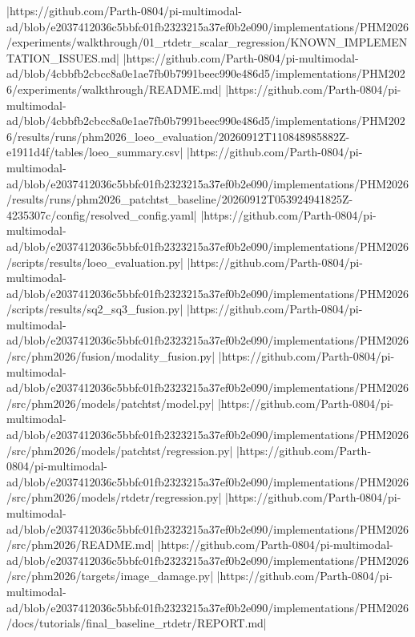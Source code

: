 |https://github.com/Parth-0804/pi-multimodal-ad/blob/e2037412036c5bbfc01fb2323215a37ef0b2e090/implementations/PHM2026/experiments/walkthrough/01_rtdetr_scalar_regression/KNOWN_IMPLEMENTATION_ISSUES.md|
|https://github.com/Parth-0804/pi-multimodal-ad/blob/4cbbfb2cbcc8a0e1ae7fb0b7991beec990e486d5/implementations/PHM2026/experiments/walkthrough/README.md|
|https://github.com/Parth-0804/pi-multimodal-ad/blob/4cbbfb2cbcc8a0e1ae7fb0b7991beec990e486d5/implementations/PHM2026/results/runs/phm2026_loeo_evaluation/20260912T110848985882Z-e1911d4f/tables/loeo_summary.csv|
|https://github.com/Parth-0804/pi-multimodal-ad/blob/e2037412036c5bbfc01fb2323215a37ef0b2e090/implementations/PHM2026/results/runs/phm2026_patchtst_baseline/20260912T053924941825Z-4235307c/config/resolved_config.yaml|
|https://github.com/Parth-0804/pi-multimodal-ad/blob/e2037412036c5bbfc01fb2323215a37ef0b2e090/implementations/PHM2026/scripts/results/loeo_evaluation.py|
|https://github.com/Parth-0804/pi-multimodal-ad/blob/e2037412036c5bbfc01fb2323215a37ef0b2e090/implementations/PHM2026/scripts/results/sq2_sq3_fusion.py|
|https://github.com/Parth-0804/pi-multimodal-ad/blob/e2037412036c5bbfc01fb2323215a37ef0b2e090/implementations/PHM2026/src/phm2026/fusion/modality_fusion.py|
|https://github.com/Parth-0804/pi-multimodal-ad/blob/e2037412036c5bbfc01fb2323215a37ef0b2e090/implementations/PHM2026/src/phm2026/models/patchtst/model.py|
|https://github.com/Parth-0804/pi-multimodal-ad/blob/e2037412036c5bbfc01fb2323215a37ef0b2e090/implementations/PHM2026/src/phm2026/models/patchtst/regression.py|
|https://github.com/Parth-0804/pi-multimodal-ad/blob/e2037412036c5bbfc01fb2323215a37ef0b2e090/implementations/PHM2026/src/phm2026/models/rtdetr/regression.py|
|https://github.com/Parth-0804/pi-multimodal-ad/blob/e2037412036c5bbfc01fb2323215a37ef0b2e090/implementations/PHM2026/src/phm2026/README.md|
|https://github.com/Parth-0804/pi-multimodal-ad/blob/e2037412036c5bbfc01fb2323215a37ef0b2e090/implementations/PHM2026/src/phm2026/targets/image_damage.py|
|https://github.com/Parth-0804/pi-multimodal-ad/blob/e2037412036c5bbfc01fb2323215a37ef0b2e090/implementations/PHM2026/docs/tutorials/final_baseline_rtdetr/REPORT.md|
